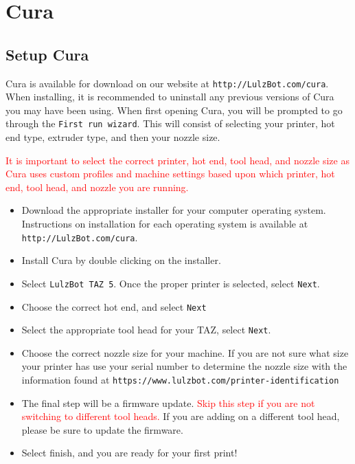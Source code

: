 %
%
%
%
%

\section{Cura}
\label{Cura}

\subsection{Setup Cura}
Cura is available for download on our website at \texttt{http://LulzBot.com/cura}. When installing, it is recommended to uninstall any previous versions of Cura you may have been using. 
When first opening Cura, you will be prompted to go through the \texttt{First run wizard}. This will consist of selecting your printer, hot end type, extruder type, and then your nozzle size.

\textcolor{red}{It is important to select the correct printer, hot end, tool head, and nozzle size as Cura uses custom profiles and machine settings based upon which printer, hot end, tool head, and nozzle you are running.}

\begin{itemize}
\item Download the appropriate installer for your computer operating system. Instructions on installation for each operating system is available at \texttt{http://LulzBot.com/cura}.
\item Install Cura by double clicking on the installer.
\item Select \texttt{LulzBot TAZ 5}. Once the proper printer is selected, select \texttt{Next}.
\item Choose the correct hot end, and select \texttt{Next}
\item Select the appropriate tool head for your TAZ, select \texttt{Next}.
\item Choose the correct nozzle size for your machine. If you are not sure what size your printer has use your serial number to determine the nozzle size with the information found at \texttt{https://www.lulzbot.com/printer-identification}
\item The final step will be a firmware update. \textcolor{red}{Skip this step if you are not switching to different tool heads.} If you are adding on a different tool head, please be sure to update the firmware.
\item Select finish, and you are ready for your first print!
\end{itemize}



